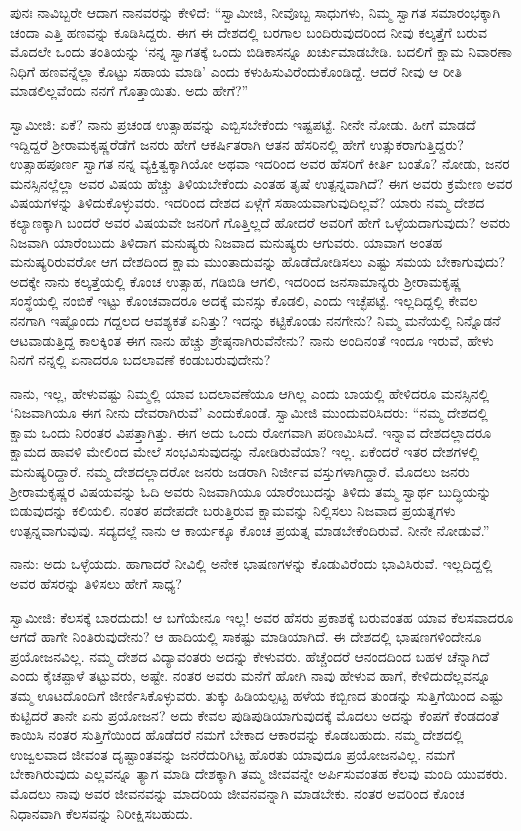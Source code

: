 ಪುನಃ ನಾವಿಬ್ಬರೇ ಆದಾಗ ನಾನವರನ್ನು ಕೇಳಿದೆ: “ಸ್ವಾಮೀಜಿ, ನೀವೊಬ್ಬ ಸಾಧುಗಳು, ನಿಮ್ಮ ಸ್ವಾಗತ ಸಮಾರಂಭಕ್ಕಾಗಿ ಚಂದಾ ಎತ್ತಿ ಹಣವನ್ನು ಕೂಡಿಸಿದ್ದರು. ಈಗ ಈ ದೇಶದಲ್ಲಿ ಬರಗಾಲ ಬಂದಿರುವುದರಿಂದ ನೀವು ಕಲ್ಕತ್ತೆಗೆ ಬರುವ ಮೊದಲೇ ಒಂದು ತಂತಿಯನ್ನು ‘ನನ್ನ ಸ್ವಾಗತಕ್ಕೆ ಒಂದು ಬಿಡಿಕಾಸನ್ನೂ ಖರ್ಚುಮಾಡಬೇಡಿ. ಬದಲಿಗೆ ಕ್ಷಾಮ ನಿವಾರಣಾ ನಿಧಿಗೆ ಹಣವನ್ನೆಲ್ಲಾ ಕೊಟ್ಟು ಸಹಾಯ ಮಾಡಿ’ ಎಂದು ಕಳುಹಿಸುವಿರೆಂದುಕೊಂಡಿದ್ದೆ. ಆದರೆ ನೀವು ಆ ರೀತಿ ಮಾಡಲಿಲ್ಲವೆಂದು ನನಗೆ ಗೊತ್ತಾಯಿತು. ಅದು ಹೇಗೆ?”

ಸ್ವಾಮೀಜಿ: ಏಕೆ? ನಾನು ಪ್ರಚಂಡ ಉತ್ಸಾಹವನ್ನು ಎಬ್ಬಿಸಬೇಕೆಂದು ಇಷ್ಟಪಟ್ಟೆ. ನೀನೇ ನೋಡು. ಹೀಗೆ ಮಾಡದೆ ಇದ್ದಿದ್ದರೆ ಶ‍್ರೀರಾಮಕೃಷ್ಣರೆಡೆಗೆ ಜನರು ಹೇಗೆ ಆಕರ್ಷಿತರಾಗಿ ಆತನ ಹೆಸರಿನಲ್ಲಿ ಹೇಗೆ ಉತ್ಸುಕರಾಗುತ್ತಿದ್ದರು? ಉತ್ಸಾಹಪೂರ್ಣ ಸ್ವಾಗತ ನನ್ನ ವ್ಯಕ್ತಿತ್ವಕ್ಕಾಗಿಯೋ ಅಥವಾ ಇದರಿಂದ ಅವರ ಹೆಸರಿಗೆ ಕೀರ್ತಿ ಬಂತೊ? ನೋಡು, ಜನರ ಮನಸ್ಸಿನಲ್ಲೆಲ್ಲಾ ಅವರ ವಿಷಯ ಹೆಚ್ಚು ತಿಳಿಯಬೇಕೆಂದು ಎಂತಹ ತೃಷೆ ಉತ್ಪನ್ನವಾಗಿದೆ? ಈಗ ಅವರು ಕ್ರಮೇಣ ಅವರ ವಿಷಯಗಳನ್ನು ತಿಳಿದುಕೊಳ್ಳುವರು. ಇದರಿಂದ ದೇಶದ ಏಳ್ಗೆಗೆ ಸಹಾಯವಾಗುವುದಿಲ್ಲವೆ? ಯಾರು ನಮ್ಮ ದೇಶದ ಕಲ್ಯಾಣಕ್ಕಾಗಿ ಬಂದರೆ ಅವರ ವಿಷಯವೇ ಜನರಿಗೆ ಗೊತ್ತಿಲ್ಲದೆ ಹೋದರೆ ಅವರಿಗೆ ಹೇಗೆ ಒಳ್ಳೆಯದಾಗುವುದು? ಅವರು ನಿಜವಾಗಿ ಯಾರೆಂಬುದು ತಿಳಿದಾಗ ಮನುಷ್ಯರು ನಿಜವಾದ ಮನುಷ್ಯರು ಆಗುವರು. ಯಾವಾಗ ಅಂತಹ ಮನುಷ್ಯರಿರುವರೋ ಆಗ ದೇಶದಿಂದ ಕ್ಷಾಮ ಮುಂತಾದುವನ್ನು ಹೊಡೆದೋಡಿಸಲು ಎಷ್ಟು ಸಮಯ ಬೇಕಾಗುವುದು? ಅದಕ್ಕೇ ನಾನು ಕಲ್ಕತ್ತೆಯಲ್ಲಿ ಕೊಂಚ ಉತ್ಸಾಹ, ಗಡಿಬಿಡಿ ಆಗಲಿ, ಇದರಿಂದ ಜನಸಾಮಾನ್ಯರು ಶ‍್ರೀರಾಮಕೃಷ್ಣ ಸಂಸ್ಥೆಯಲ್ಲಿ ನಂಬಿಕೆ ಇಟ್ಟು ಕೊಂಚವಾದರೂ ಅದಕ್ಕೆ ಮನಸ್ಸು ಕೊಡಲಿ, ಎಂದು ಇಚ್ಛೆಪಟ್ಟೆ. ಇಲ್ಲದಿದ್ದಲ್ಲಿ ಕೇವಲ ನನಗಾಗಿ ಇಷ್ಟೊಂದು ಗದ್ದಲದ ಆವಶ್ಯಕತೆ ಏನಿತ್ತು? ಇದನ್ನು ಕಟ್ಟಿಕೊಂಡು ನನಗೇನು? ನಿಮ್ಮ ಮನೆಯಲ್ಲಿ ನಿನ್ನೊಡನೆ ಆಟವಾಡುತ್ತಿದ್ದ ಕಾಲಕ್ಕಿಂತ ಈಗ ನಾನು ಹೆಚ್ಚು ಶ್ರೇಷ್ಠನಾಗಿರುವೆನೇನು? ನಾನು ಅಂದಿನಂತೆ ಇಂದೂ ಇರುವೆ, ಹೇಳು ನಿನಗೆ ನನ್ನಲ್ಲಿ ಏನಾದರೂ ಬದಲಾವಣೆ ಕಂಡುಬರುವುದೇನು?

ನಾನು, ಇಲ್ಲ, ಹೇಳುವಷ್ಟು ನಿಮ್ಮಲ್ಲಿ ಯಾವ ಬದಲಾವಣೆಯೂ ಆಗಿಲ್ಲ ಎಂದು ಬಾಯಲ್ಲಿ ಹೇಳಿದರೂ ಮನಸ್ಸಿನಲ್ಲಿ ‘ನಿಜವಾಗಿಯೂ ಈಗ ನೀನು ದೇವರಾಗಿರುವೆ’ ಎಂದುಕೊಂಡೆ. ಸ್ವಾಮೀಜಿ ಮುಂದುವರಿಸಿದರು: “ನಮ್ಮ ದೇಶದಲ್ಲಿ ಕ್ಷಾಮ ಒಂದು ನಿರಂತರ ವಿಪತ್ತಾಗಿತ್ತು. ಈಗ ಅದು ಒಂದು ರೋಗವಾಗಿ ಪರಿಣಮಿಸಿದೆ. ಇನ್ನಾವ ದೇಶದಲ್ಲಾದರೂ ಕ್ಷಾಮದ ಹಾವಳಿ ಮೇಲಿಂದ ಮೇಲೆ ಸಂಭವಿಸುವುದನ್ನು ನೋಡಿರುವೆಯಾ? ಇಲ್ಲ. ಏಕೆಂದರೆ ಇತರ ದೇಶಗಳಲ್ಲಿ ಮನುಷ್ಯರಿದ್ದಾರೆ. ನಮ್ಮ ದೇಶದಲ್ಲಾದರೋ ಜನರು ಜಡರಾಗಿ ನಿರ್ಜೀವ ವಸ್ತುಗಳಾಗಿದ್ದಾರೆ. ಮೊದಲು ಜನರು ಶ‍್ರೀರಾಮಕೃಷ್ಣರ ವಿಷಯವನ್ನು ಓದಿ ಅವರು ನಿಜವಾಗಿಯೂ ಯಾರೆಂಬುದನ್ನು ತಿಳಿದು ತಮ್ಮ ಸ್ವಾರ್ಥ ಬುದ್ಧಿಯನ್ನು ಬಿಡುವುದನ್ನು ಕಲಿಯಲಿ. ನಂತರ ಪದೇಪದೇ ಬರುತ್ತಿರುವ ಕ್ಷಾಮವನ್ನು ನಿಲ್ಲಿಸಲು ನಿಜವಾದ ಪ್ರಯತ್ನಗಳು ಉತ್ಪನ್ನವಾಗುವುವು. ಸದ್ಯದಲ್ಲೆ ನಾನು ಆ ಕಾರ್ಯಕ್ಕೂ ಕೊಂಚ ಪ್ರಯತ್ನ ಮಾಡಬೇಕೆಂದಿರುವೆ. ನೀನೇ ನೋಡುವೆ.”

ನಾನು: ಅದು ಒಳ್ಳೆಯದು. ಹಾಗಾದರೆ ನೀವಿಲ್ಲಿ ಅನೇಕ ಭಾಷಣಗಳನ್ನು ಕೊಡುವಿರೆಂದು ಭಾವಿಸಿರುವೆ. ಇಲ್ಲದಿದ್ದಲ್ಲಿ ಅವರ ಹೆಸರನ್ನು ತಿಳಿಸಲು ಹೇಗೆ ಸಾಧ್ಯ?

ಸ್ವಾಮೀಜಿ: ಕೆಲಸಕ್ಕೆ ಬಾರದುದು! ಆ ಬಗೆಯೇನೂ ಇಲ್ಲ! ಅವರ ಹೆಸರು ಪ್ರಕಾಶಕ್ಕೆ ಬರುವಂತಹ ಯಾವ ಕೆಲಸವಾದರೂ ಆಗದೆ ಹಾಗೇ ನಿಂತಿರುವುದೇನು? ಆ ಹಾದಿಯಲ್ಲಿ ಸಾಕಷ್ಟು ಮಾಡಿಯಾಗಿದೆ. ಈ ದೇಶದಲ್ಲಿ ಭಾಷಣಗಳಿಂದೇನೂ ಪ್ರಯೋಜನವಿಲ್ಲ. ನಮ್ಮ ದೇಶದ ವಿದ್ಯಾವಂತರು ಅದನ್ನು ಕೇಳುವರು. ಹೆಚ್ಚೆಂದರೆ ಆನಂದದಿಂದ ಬಹಳ ಚೆನ್ನಾಗಿದೆ ಎಂದು ಕೈಚಪ್ಪಾಳೆ ತಟ್ಟುವರು, ಅಷ್ಟೇ. ನಂತರ ಅವರು ಮನೆಗೆ ಹೋಗಿ ನಾವು ಹೇಳುವ ಹಾಗೆ, ಕೇಳಿದುದೆಲ್ಲವನ್ನೂ ತಮ್ಮ ಊಟದೊಂದಿಗೆ ಜೀರ್ಣಿಸಿಕೊಳ್ಳುವರು. ತುಕ್ಕು ಹಿಡಿಯಲ್ಪಟ್ಟ ಹಳೆಯ ಕಬ್ಬಿಣದ ತುಂಡನ್ನು ಸುತ್ತಿಗೆಯಿಂದ ಎಷ್ಟು ಕುಟ್ಟಿದರೆ ತಾನೇ ಏನು ಪ್ರಯೋಜನ? ಅದು ಕೇವಲ ಪುಡಿಪುಡಿಯಾಗುವುದಕ್ಕೆ ಮೊದಲು ಅದನ್ನು ಕೆಂಪಗೆ ಕೆಂಡದಂತೆ ಕಾಯಿಸಿ ನಂತರ ಸುತ್ತಿಗೆಯಿಂದ ಹೊಡೆದರೆ ನಮಗೆ ಬೇಕಾದ ಆಕಾರವನ್ನು ಕೊಡಬಹುದು. ನಮ್ಮ ದೇಶದಲ್ಲಿ ಉಜ್ವಲವಾದ ಜೀವಂತ ದೃಷ್ಟಾಂತವನ್ನು ಜನರೆದುರಿಗಿಟ್ಟ ಹೊರತು ಯಾವುದೂ ಪ್ರಯೋಜನವಿಲ್ಲ. ನಮಗೆ ಬೇಕಾಗಿರುವುದು ಎಲ್ಲವನ್ನೂ ತ್ಯಾಗ ಮಾಡಿ ದೇಶಕ್ಕಾಗಿ ತಮ್ಮ ಜೀವವನ್ನೇ ಅರ್ಪಿಸುವಂತಹ ಕೆಲವು ಮಂದಿ ಯುವಕರು. ಮೊದಲು ನಾವು ಅವರ ಜೀವನವನ್ನು ಮಾದರಿಯ ಜೀವನವನ್ನಾಗಿ ಮಾಡಬೇಕು. ನಂತರ ಅವರಿಂದ ಕೊಂಚ ನಿಧಾನವಾಗಿ ಕೆಲಸವನ್ನು ನಿರೀಕ್ಷಿಸಬಹುದು.

